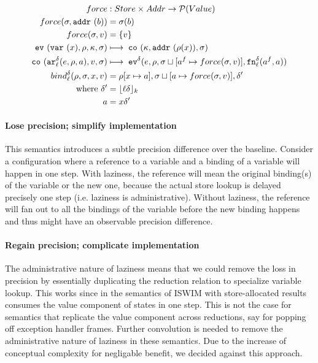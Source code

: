 \documentclass[preprint,onecolumn,9pt]{sigplanconf} %
\begin{document}
\begin{align*}
force &: Store \times Addr \to \Set(Value) \\
force(\msto,\saddr\maddralt) &= \msto(\maddralt)\\
force(\msto,\mval) &= \{\mval\}\\
\ev{\svar{\mvar},\menv,\mkont,\msto} &\machstep\;
\co{\mkont,\saddr{\menv(\mvar)},\msto} \\
\co{\kar[^\mcntr_\mlab]{\mexp,\menv,\maddr},\mval,\msto}
&\machstep\;
\ev[^\mcntr]{\mexp,\menv,\msto\sqcup[\maddr^f \mapsto force(\msto,\mval)],\kfn[^\mcntr_\mlab]{\maddr^f,\maddr}} \\
bind^\mcntr_\mlab(\menv,\msto,\mvar,\mval) &= \menv[\mvar \mapsto
  \maddr], \msto\sqcup[\maddr \mapsto force(\msto, \mval)], \mcntr' \\
\mbox{where } \mcntr' &= \lfloor\mlab\mcntr\rfloor_k \\
              \maddr &= \mvar\mcntr'
\end{align*}

\paragraph{Lose precision; simplify implementation}
This semantics introduces a subtle precision difference over the
baseline. Consider a configuration where a reference to a variable and
a binding of a variable will happen in one step. With laziness, the
reference will mean the original binding(s) of the variable or the new
one, because the actual store lookup is delayed precisely one step
(i.e. laziness is administrative). Without laziness, the reference
will fan out to all the bindings of the variable before the new
binding happens and thus might have an observable precision
difference.

\paragraph{Regain precision; complicate implementation}
The administrative nature of laziness means that we could remove the
loss in precision by essentially duplicating the reduction relation to
specialize variable lookup. This works since in the semantics of ISWIM
with store-allocated results consumes the value component of states in
one step. This is not the case for semantics that replicate the value
component across reductions, say for popping off exception handler
frames. Further convolution is needed to remove the administrative
nature of laziness in these semantics. Due to the increase of
conceptual complexity for negligable benefit, we decided against this
approach.
\end{document}
